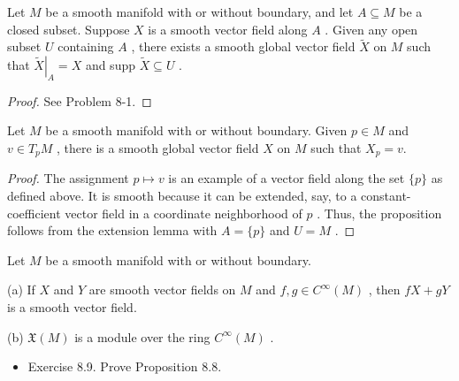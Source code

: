\begin{lemma}
\label{lem:8-6}
\leanok
{}
Let $M$ be a smooth manifold with or without boundary, and let $A \subseteq  M$ be a closed subset. Suppose $X$ is a smooth vector field along $A$ . Given any open subset $U$ containing $A$ , there exists a smooth global vector field $\widetilde{X}$ on $M$ such that ${\left. \widetilde{X}\right| }_{A} = X$ and supp $\widetilde{X} \subseteq  U$ .
\end{lemma}

\begin{proof}
\leanok
See Problem 8-1.
\end{proof}

\begin{proposition}
\label{prop:8-7}
\leanok
{}
Let $M$ be a smooth manifold with or without boundary. Given $p \in  M$ and $v \in  {T}_{p}M$ , there is a smooth global vector field $X$ on $M$ such that ${X}_{p} = v.$
\end{proposition}

\begin{proof}
\leanok
The assignment $p \mapsto  v$ is an example of a vector field along the set $\{ p\}$ as defined above. It is smooth because it can be extended, say, to a constant-coefficient vector field in a coordinate neighborhood of $p$ . Thus, the proposition follows from the extension lemma with $A = \{ p\}$ and $U = M$ .
\end{proof}

\begin{proposition}
\label{prop:8-8}
\leanok
{}
Let $M$ be a smooth manifold with or without boundary.

(a) If $X$ and $Y$ are smooth vector fields on $M$ and $f, g \in  {C}^{\infty }\left( M\right)$ , then ${fX} + {gY}$ is a smooth vector field.

(b) $\mathfrak{X}\left( M\right)$ is a module over the ring ${C}^{\infty }\left( M\right)$ .
\end{proposition}

\begin{exercise}
\label{exer:8-9}
\leanok
{}
\begin{itemize}
\item Exercise 8.9. Prove Proposition 8.8.
\end{itemize}
\end{exercise}


